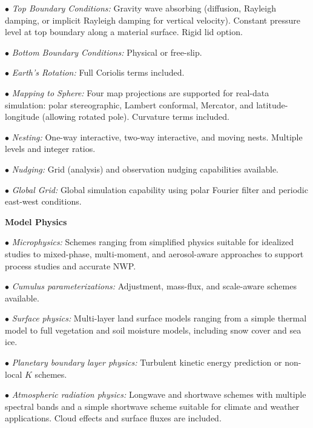\begin{description}
\item{$\bullet$} {\em Top Boundary Conditions:} 
Gravity wave absorbing (diffusion, Rayleigh damping, or implicit 
Rayleigh damping for vertical velocity).  
Constant pressure level at top boundary along a material surface. 
Rigid lid option.
%
\item{$\bullet$} {\em Bottom Boundary Conditions:} 
Physical or free-slip.
%
\item{$\bullet$} {\em Earth's Rotation:}
Full Coriolis terms included.
%
\item{$\bullet$} {\em Mapping to Sphere:} 
Four map projections are supported for real-data simulation: 
polar stereographic, Lambert conformal, Mercator, and 
latitude-longitude (allowing rotated pole). 
Curvature terms included.
%
\item{$\bullet$} {\em Nesting:} 
One-way interactive, two-way interactive, and moving nests.
Multiple levels and integer ratios.
%
\item{$\bullet$} {\em Nudging:}
Grid (analysis) and observation nudging capabilities available. 
%
\item{$\bullet$} {\em Global Grid:}
Global simulation capability using polar Fourier filter and 
periodic east-west conditions. 
\end{description}

\newpage
\vskip 12pt
{\noindent\bf Model Physics}
\vskip 12pt

\begin{description}
\setlength{\itemsep}{-5pt}
\item{$\bullet$} {\em Microphysics:} Schemes ranging from simplified
physics suitable for idealized studies to mixed-phase, multi-moment, and aerosol-aware
approaches to support process studies and accurate NWP.
%
\item{$\bullet$} {\em Cumulus parameterizations:}
Adjustment, mass-flux, and scale-aware schemes available.
%
\item{$\bullet$} {\em Surface physics:}
Multi-layer land surface models ranging from a simple thermal model to full
vegetation and soil moisture models, including snow cover and sea ice.
%
\item{$\bullet$} {\em Planetary boundary layer physics:}
Turbulent kinetic energy prediction or non-local $K$ schemes.
%
\item{$\bullet$} {\em Atmospheric radiation physics:} 
Longwave and shortwave schemes with multiple spectral bands and a 
simple shortwave scheme suitable for climate and weather applications.  
Cloud effects and surface fluxes are included.
\end{description}

